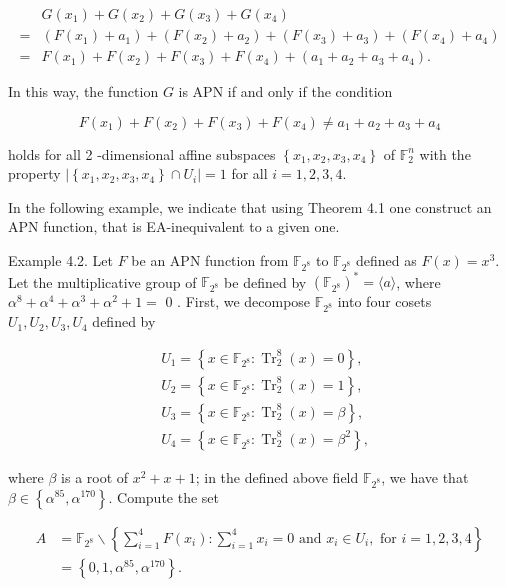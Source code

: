 \documentclass[10pt]{article}
\begin{document}
$$
\begin{aligned}
& G\left(x_{1}\right)+G\left(x_{2}\right)+G\left(x_{3}\right)+G\left(x_{4}\right) \\
= & \left(F\left(x_{1}\right)+a_{1}\right)+\left(F\left(x_{2}\right)+a_{2}\right)+\left(F\left(x_{3}\right)+a_{3}\right)+\left(F\left(x_{4}\right)+a_{4}\right) \\
= & F\left(x_{1}\right)+F\left(x_{2}\right)+F\left(x_{3}\right)+F\left(x_{4}\right)+\left(a_{1}+a_{2}+a_{3}+a_{4}\right) .
\end{aligned}
$$

In this way, the function $G$ is APN if and only if the condition

$$
F\left(x_{1}\right)+F\left(x_{2}\right)+F\left(x_{3}\right)+F\left(x_{4}\right) \neq a_{1}+a_{2}+a_{3}+a_{4}
$$

holds for all 2 -dimensional affine subspaces $\left\{x_{1}, x_{2}, x_{3}, x_{4}\right\}$ of $\mathbb{F}_{2}^{n}$ with the property $\left|\left\{x_{1}, x_{2}, x_{3}, x_{4}\right\} \cap U_{i}\right|=1$ for all $i=1,2,3,4$.

In the following example, we indicate that using Theorem 4.1 one construct an APN function, that is EA-inequivalent to a given one.

Example 4.2. Let $F$ be an APN function from $\mathbb{F}_{2^{8}}$ to $\mathbb{F}_{2^{8}}$ defined as $F(x)=x^{3}$. Let the multiplicative group of $\mathbb{F}_{2^{8}}$ be defined by $\left(\mathbb{F}_{2^{8}}\right)^{*}=\langle a\rangle$, where $\alpha^{8}+\alpha^{4}+\alpha^{3}+\alpha^{2}+1=$ 0 . First, we decompose $\mathbb{F}_{2^{8}}$ into four cosets $U_{1}, U_{2}, U_{3}, U_{4}$ defined by

$$
\begin{aligned}
& U_{1}=\left\{x \in \mathbb{F}_{2^{8}}: \operatorname{Tr}_{2}^{8}(x)=0\right\}, \\
& U_{2}=\left\{x \in \mathbb{F}_{2^{8}}: \operatorname{Tr}_{2}^{8}(x)=1\right\}, \\
& U_{3}=\left\{x \in \mathbb{F}_{2^{8}}: \operatorname{Tr}_{2}^{8}(x)=\beta\right\}, \\
& U_{4}=\left\{x \in \mathbb{F}_{2^{8}}: \operatorname{Tr}_{2}^{8}(x)=\beta^{2}\right\},
\end{aligned}
$$

where $\beta$ is a root of $x^{2}+x+1$; in the defined above field $\mathbb{F}_{2^{8}}$, we have that $\beta \in \left\{\alpha^{85}, \alpha^{170}\right\}$. Compute the set

$$
\begin{aligned}
A & =\mathbb{F}_{2^{8}} \backslash\left\{\sum_{i=1}^{4} F\left(x_{i}\right): \sum_{i=1}^{4} x_{i}=0 \text { and } x_{i} \in U_{i}, \text { for } i=1,2,3,4\right\} \\
& =\left\{0,1, \alpha^{85}, \alpha^{170}\right\} .
\end{aligned}
$$
\end{document}
